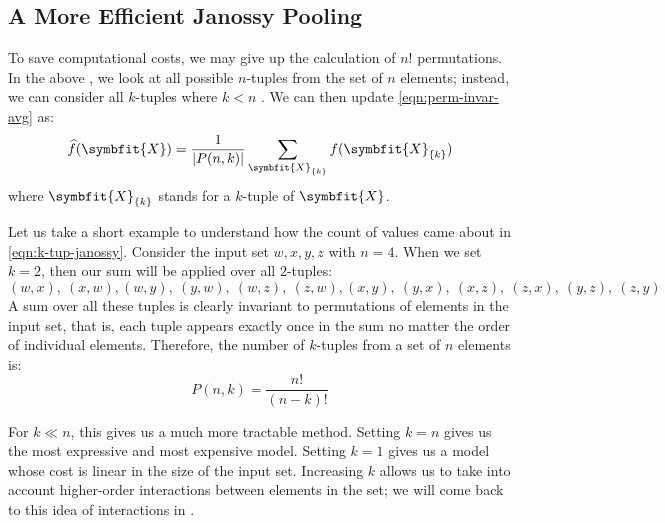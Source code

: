 \subsection{A More Efficient Janossy Pooling}\label{ssec:efficient-janossy}

To save computational costs, we may give up the calculation of $n!$ permutations. In the above , we look at all possible $n$-tuples from the set of $n$ elements; instead, we can consider all $k$-tuples where $k \less n$ \parencite{Murphy2018}. We can then update \cref{eqn:perm-invar-avg} as:
\begin{equation}
    \label{eqn:k-tup-janossy}
    \widehat{f}(\symbfit{X}) = \frac{1}{|P(n, k)|} \sum_{\symbfit{X}_{\{k\}}} f(\symbfit{X}_{\{k\}})
\end{equation}
where $\symbfit{X}_{\{k\}}$ stands for a $k$-tuple of $\symbfit{X}$.

Let us take a short example to understand how the count of values came about in \cref{eqn:k-tup-janossy}. Consider the input set ${w, x, y, z}$ with $n=4$. When we set $k=2$, then our sum will be applied over all $2$-tuples:
\[(w, x),~(x, w),(w, y),~(y, w),~(w, z),~(z, w),
(x, y),~(y, x),~(x, z),~(z, x),~(y, z),~(z, y)
\]
A sum over all these tuples is clearly invariant to permutations of elements in the input set, that is, each tuple appears exactly once in the sum no matter the order of individual elements. Therefore, the number of $k$-tuples from a set of $n$ elements is:
\begin{equation}
\label{eqn:k-tup-cnt}
    P(n,k) = \frac{n!}{(n-k)!}
\end{equation}

For $k \ll n$, this gives us a much more tractable method. Setting $k=n$ gives us the most expressive and most expensive model. Setting $k=1$ gives us a model whose cost is linear in the size of the input set. Increasing $k$ allows us to take into account higher-order interactions between elements in the set; we will come back to this idea of interactions in .

